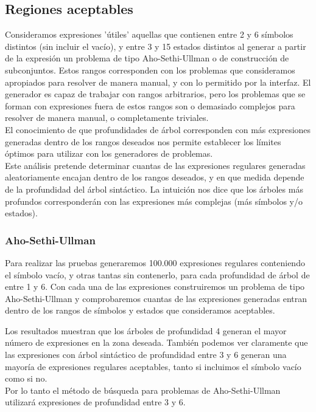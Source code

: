 \subsection{Regiones aceptables}

Consideramos expresiones 'útiles' aquellas que contienen entre 2 y 6 símbolos distintos (sin incluir el vacío), y entre 3 y 15 estados distintos al generar a partir de la expresión un problema de tipo Aho-Sethi-Ullman o de construcción de subconjuntos.
Estos rangos corresponden con los problemas que consideramos apropiados para resolver de manera manual, y con lo permitido por la interfaz.
El generador es capaz de trabajar con rangos arbitrarios, pero los problemas que se forman con expresiones fuera de estos rangos son o demasiado complejos para resolver de manera manual, o completamente triviales.
\\
El conocimiento de que profundidades de árbol corresponden con más expresiones generadas dentro de los rangos deseados nos permite establecer los límites óptimos para utilizar con los generadores de problemas.
\\
Este análisis pretende determinar cuantas de las expresiones regulares generadas aleatoriamente encajan dentro de los rangos deseados, y en que medida depende de la profundidad del árbol sintáctico.
La intuición nos dice que los árboles más profundos corresponderán con las expresiones más complejas (más símbolos y/o estados).

\subsubsection{Aho-Sethi-Ullman}

Para realizar las pruebas generaremos 100.000 expresiones regulares conteniendo el símbolo vacío, y otras tantas sin contenerlo, para cada profundidad de árbol de entre 1 y 6.
Con cada una de las expresiones construiremos un problema de tipo Aho-Sethi-Ullman y comprobaremos cuantas de las expresiones generadas entran dentro de los rangos de símbolos y estados que consideramos aceptables.


Los resultados muestran que los árboles de profundidad 4 generan el mayor número de expresiones en la zona deseada.
También podemos ver claramente que las expresiones con árbol sintáctico de profundidad entre 3 y 6 generan una mayoría de expresiones regulares aceptables, tanto si incluimos el símbolo vacío como si no.
\\
Por lo tanto el método de búsqueda para problemas de Aho-Sethi-Ullman utilizará expresiones de profundidad entre 3 y 6.

